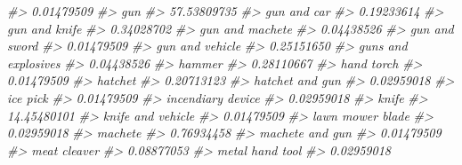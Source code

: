 \documentclass[
]{krantz}
\makeatletter
\newenvironment{Shaded}{\begin{snugshade}}{\end{snugshade}}
\newcommand{\CommentTok}[1]{\textcolor[rgb]{0.37,0.37,0.37}{\textit{#1}}}
\newenvironment{kframe}{%
\medskip{}
\setlength{\fboxsep}{.8em}
 \def\at@end@of@kframe{}%
 \ifinner\ifhmode%
  \def\at@end@of@kframe{\end{minipage}}%
  \begin{minipage}{\columnwidth}%
 \fi\fi%
 \def\FrameCommand##1{\hskip\@totalleftmargin \hskip-\fboxsep
 \colorbox{shadecolor}{##1}\hskip-\fboxsep
     \hskip-\linewidth \hskip-\@totalleftmargin \hskip\columnwidth}%
 \MakeFramed {\advance\hsize-\width
   \@totalleftmargin\z@ \linewidth\hsize
   \@setminipage}}%
 {\par\unskip\endMakeFramed%
 \at@end@of@kframe}
\renewenvironment{Shaded}{\begin{kframe}}{\end{kframe}}
\makeatother
\begin{document}
\begin{Shaded}
\begin{Highlighting}[]
\CommentTok{\#\textgreater{}                       0.01479509 }
\CommentTok{\#\textgreater{}                              gun }
\CommentTok{\#\textgreater{}                      57.53809735 }
\CommentTok{\#\textgreater{}                      gun and car }
\CommentTok{\#\textgreater{}                       0.19233614 }
\CommentTok{\#\textgreater{}                    gun and knife }
\CommentTok{\#\textgreater{}                       0.34028702 }
\CommentTok{\#\textgreater{}                  gun and machete }
\CommentTok{\#\textgreater{}                       0.04438526 }
\CommentTok{\#\textgreater{}                    gun and sword }
\CommentTok{\#\textgreater{}                       0.01479509 }
\CommentTok{\#\textgreater{}                  gun and vehicle }
\CommentTok{\#\textgreater{}                       0.25151650 }
\CommentTok{\#\textgreater{}              guns and explosives }
\CommentTok{\#\textgreater{}                       0.04438526 }
\CommentTok{\#\textgreater{}                           hammer }
\CommentTok{\#\textgreater{}                       0.28110667 }
\CommentTok{\#\textgreater{}                       hand torch }
\CommentTok{\#\textgreater{}                       0.01479509 }
\CommentTok{\#\textgreater{}                          hatchet }
\CommentTok{\#\textgreater{}                       0.20713123 }
\CommentTok{\#\textgreater{}                  hatchet and gun }
\CommentTok{\#\textgreater{}                       0.02959018 }
\CommentTok{\#\textgreater{}                         ice pick }
\CommentTok{\#\textgreater{}                       0.01479509 }
\CommentTok{\#\textgreater{}                incendiary device }
\CommentTok{\#\textgreater{}                       0.02959018 }
\CommentTok{\#\textgreater{}                            knife }
\CommentTok{\#\textgreater{}                      14.45480101 }
\CommentTok{\#\textgreater{}                knife and vehicle }
\CommentTok{\#\textgreater{}                       0.01479509 }
\CommentTok{\#\textgreater{}                 lawn mower blade }
\CommentTok{\#\textgreater{}                       0.02959018 }
\CommentTok{\#\textgreater{}                          machete }
\CommentTok{\#\textgreater{}                       0.76934458 }
\CommentTok{\#\textgreater{}                  machete and gun }
\CommentTok{\#\textgreater{}                       0.01479509 }
\CommentTok{\#\textgreater{}                     meat cleaver }
\CommentTok{\#\textgreater{}                       0.08877053 }
\CommentTok{\#\textgreater{}                  metal hand tool }
\CommentTok{\#\textgreater{}                       0.02959018 }

\end{Highlighting}
\end{Shaded}
\end{document}
